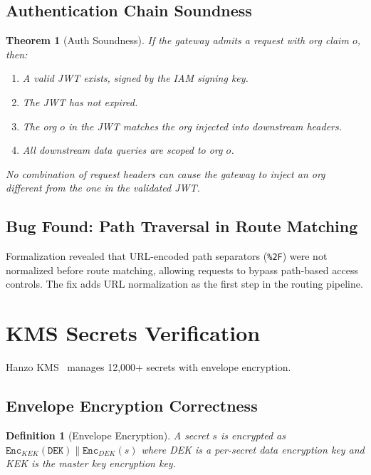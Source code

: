 \documentclass[11pt]{article}
\newtheorem{theorem}{Theorem}
\newtheorem{definition}{Definition}
\begin{document}
\subsection{Authentication Chain Soundness}

\begin{theorem}[Auth Soundness]
If the gateway admits a request with org claim $o$, then:
\begin{enumerate}[leftmargin=1.4em]
    \item A valid JWT exists, signed by the IAM signing key.
    \item The JWT has not expired.
    \item The org $o$ in the JWT matches the org injected into downstream
    headers.
    \item All downstream data queries are scoped to org $o$.
\end{enumerate}
No combination of request headers can cause the gateway to inject an org
different from the one in the validated JWT.
\end{theorem}

\subsection{Bug Found: Path Traversal in Route Matching}

Formalization revealed that URL-encoded path separators (\texttt{\%2F}) were
not normalized before route matching, allowing requests to bypass path-based
access controls. The fix adds URL normalization as the first step in the
routing pipeline.

\section{KMS Secrets Verification}
\label{sec:kms}

Hanzo KMS~\cite{hanzokms} manages 12,000+ secrets with envelope encryption.

\subsection{Envelope Encryption Correctness}

\begin{definition}[Envelope Encryption]
A secret $s$ is encrypted as $\texttt{Enc}_{KEK}(\texttt{DEK}) \|
\texttt{Enc}_{DEK}(s)$ where DEK is a per-secret data encryption key and
KEK is the master key encryption key.
\end{definition}
\end{document}
